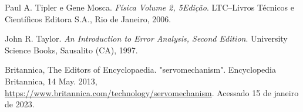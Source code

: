 \begin{thebibliography}{5}
        Paul A. Tipler e Gene Mosca.
        \textit{Física Volume 2, 5\textordfeminine Edição}. 
        LTC--Livros Técnicos e Científicos Editora S.A., Rio de Janeiro, 2006. 
    
        John R. Taylor. 
        \textit{An Introduction to Error Analysis, Second Edition}. 
        University Science Books, Sausalito (CA), 1997. 

        Britannica, The Editors of Encyclopaedia. 
        "servomechanism".
        Encyclopedia Britannica, 14 May. 2013, 
        \url{https://www.britannica.com/technology/servomechanism}. 
        Acessado 15 de janeiro de 2023.
\end{thebibliography}